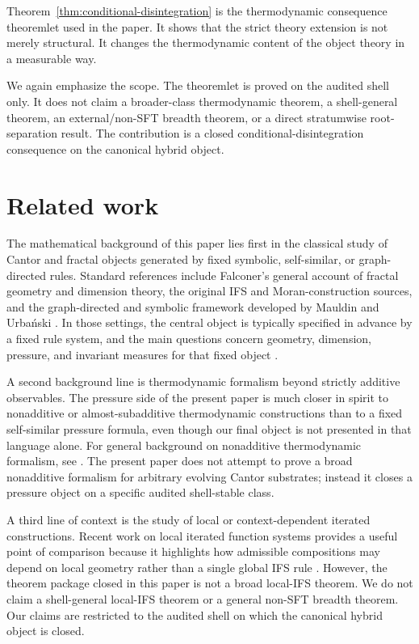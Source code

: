 \documentclass[11pt]{article}
\theoremstyle{definition}
\begin{document}
Theorem~\ref{thm:conditional-disintegration} is the thermodynamic consequence theoremlet used in the paper. It shows that the strict theory extension is not merely structural. It changes the thermodynamic content of the object theory in a measurable way.

We again emphasize the scope. The theoremlet is proved on the audited shell only. It does not claim a broader-class thermodynamic theorem, a shell-general theorem, an external/non-SFT breadth theorem, or a direct stratumwise root-separation result. The contribution is a closed conditional-disintegration consequence on the canonical hybrid object.
 \section{Related work}\label{sec:related-work}

The mathematical background of this paper lies first in the classical study of Cantor and fractal objects generated by fixed symbolic, self-similar, or graph-directed rules. Standard references include Falconer’s general account of fractal geometry and dimension theory, the original IFS and Moran-construction sources, and the graph-directed and symbolic framework developed by Mauldin and Urba\'nski \cite{Hutchinson1981Fractals,Moran1946AdditiveFunctions,FalconerFractalGeometry,MauldinUrbanskiGDMS}. In those settings, the central object is typically specified in advance by a fixed rule system, and the main questions concern geometry, dimension, pressure, and invariant measures for that fixed object \cite{Bowen1979Quasicircles,Ruelle1978ThermodynamicFormalism,WaltersErgodic1982}.

A second background line is thermodynamic formalism beyond strictly additive observables. The pressure side of the present paper is much closer in spirit to nonadditive or almost-subadditive thermodynamic constructions than to a fixed self-similar pressure formula, even though our final object is not presented in that language alone. For general background on nonadditive thermodynamic formalism, see \cite{BarreiraNonadditiveTF,CaoFengHuang2008SubAdditive,Mummert2006AlmostAdditive,Kingman1968Subadditive}. The present paper does not attempt to prove a broad nonadditive formalism for arbitrary evolving Cantor substrates; instead it closes a pressure object on a specific audited shell-stable class.

A third line of context is the study of local or context-dependent iterated constructions. Recent work on local iterated function systems provides a useful point of comparison because it highlights how admissible compositions may depend on local geometry rather than a single global IFS rule \cite{OliveiraVarandasLocalIFS,BarnsleyDemkoEltonGeronimo1988,FalconerRandomFractals1986,RempeGillenUrbanski2016NonAutonomousCIFS}. However, the theorem package closed in this paper is not a broad local-IFS theorem. We do not claim a shell-general local-IFS theorem or a general non-SFT breadth theorem. Our claims are restricted to the audited shell on which the canonical hybrid object is closed.
\end{document}
